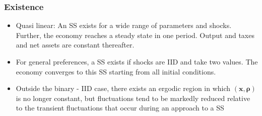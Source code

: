 \documentclass{beamer}
\begin{document}
\begin{frame}
\frametitle{Existence}
\begin{itemize}
 \item Quasi linear: An SS exists for a wide range of parameters and shocks.
 Further, the economy reaches a steady state in one period. Output and taxes and net assets are constant thereafter.
 \item For general preferences, a SS exists if shocks are IID and take two values. The economy converges to this SS starting from all initial conditions.
 \item Outside the binary - IID case, there exists an ergodic region in which $\left( \bm{x},\bm{\rho} \right) $ is no longer constant, but  fluctuations tend to be markedly reduced relative to the transient fluctuations that occur during an approach to  a SS
\end{itemize}
\end{frame}
\end{document}
